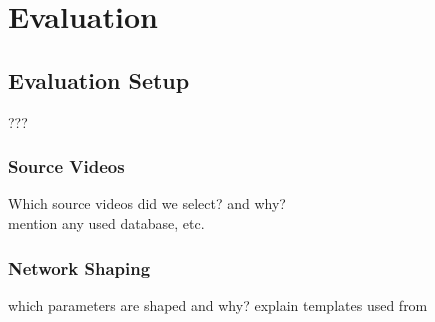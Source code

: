 \chapter{Evaluation} \label{chapter:Evaluation}

	
\section{Evaluation Setup}
???

\subsection{Source Videos}
Which source videos did we select? and why? \\
mention any used database, etc.

\subsection{Network Shaping}
which parameters are shaped and why?
explain templates used from \cite{DaI14}

